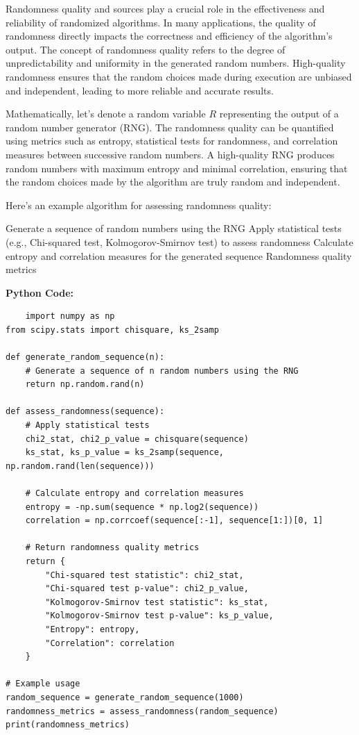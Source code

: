 \documentclass[12pt]{book} %
\begin{document}
Randomness quality and sources play a crucial role in the effectiveness and reliability of randomized algorithms. In many applications, the quality of randomness directly impacts the correctness and efficiency of the algorithm's output. The concept of randomness quality refers to the degree of unpredictability and uniformity in the generated random numbers. High-quality randomness ensures that the random choices made during execution are unbiased and independent, leading to more reliable and accurate results.

Mathematically, let's denote a random variable $R$ representing the output of a random number generator (RNG). The randomness quality can be quantified using metrics such as entropy, statistical tests for randomness, and correlation measures between successive random numbers. A high-quality RNG produces random numbers with maximum entropy and minimal correlation, ensuring that the random choices made by the algorithm are truly random and independent.

Here's an example algorithm for assessing randomness quality:
\FloatBarrier
\begin{algorithm}
\caption{Randomness Quality Assessment}
\begin{algorithmic}[1]
\State Generate a sequence of random numbers using the RNG
\State Apply statistical tests (e.g., Chi-squared test, Kolmogorov-Smirnov test) to assess randomness
\State Calculate entropy and correlation measures for the generated sequence
\Return Randomness quality metrics
\end{algorithmic}
\end{algorithm}
\FloatBarrier
\textbf{Python Code:}
\FloatBarrier
\begin{lstlisting}
    import numpy as np
from scipy.stats import chisquare, ks_2samp

def generate_random_sequence(n):
    # Generate a sequence of n random numbers using the RNG
    return np.random.rand(n)

def assess_randomness(sequence):
    # Apply statistical tests
    chi2_stat, chi2_p_value = chisquare(sequence)
    ks_stat, ks_p_value = ks_2samp(sequence, np.random.rand(len(sequence)))

    # Calculate entropy and correlation measures
    entropy = -np.sum(sequence * np.log2(sequence))
    correlation = np.corrcoef(sequence[:-1], sequence[1:])[0, 1]

    # Return randomness quality metrics
    return {
        "Chi-squared test statistic": chi2_stat,
        "Chi-squared test p-value": chi2_p_value,
        "Kolmogorov-Smirnov test statistic": ks_stat,
        "Kolmogorov-Smirnov test p-value": ks_p_value,
        "Entropy": entropy,
        "Correlation": correlation
    }

# Example usage
random_sequence = generate_random_sequence(1000)
randomness_metrics = assess_randomness(random_sequence)
print(randomness_metrics)
\end{lstlisting}
\end{document}
